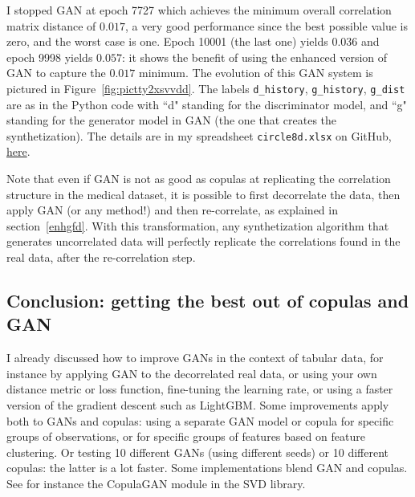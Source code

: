 \documentclass[oneside,10pt]{book}
\begin{document}
I stopped GAN at epoch 7727 which achieves the minimum overall
\textcolor{index}{correlation matrix distance} of $0.017$, a very good performance since the best possible value is zero, and the worst case is one. Epoch 10001 (the last one) yields
$0.036$ and epoch 9998 yields $0.057$: it shows the benefit of using the enhanced version of GAN to capture the $0.017$ minimum.
The evolution of this GAN system is pictured in Figure~\ref{fig:pictty2xsvvdd}. The labels \texttt{d\_history},
\texttt{g\_history}, \texttt{g\_dist} are as in the Python code with ``d" standing for the discriminator model, and ``g" standing for the generator model in GAN (the one that creates the synthetization).
The details are in my spreadsheet \texttt{circle8d.xlsx} on GitHub, \href{https://github.com/VincentGranville/Main/blob/main/circle8D.xlsx}{here}.

Note that even if GAN is not as good as copulas at replicating the correlation structure in the medical dataset, it is possible to first
\textcolor{index}{decorrelate} the data, then apply GAN (or any method!) and then re-correlate, as explained in section~\ref{enhgfd}. With this transformation, any synthetization algorithm that
 generates uncorrelated data will perfectly replicate the correlations found in the real data, after the re-correlation step.


\subsection{Conclusion: getting the best out of copulas and GAN}\label{gantrasd}

I already discussed how to improve GANs in the context of tabular data, for instance by applying GAN to the
\textcolor{index}{decorrelated} real data, or using your own distance metric or
\textcolor{index}{loss function}, fine-tuning the \textcolor{index}{learning rate}, or using a faster version of the gradient descent such as \textcolor{index}{LightGBM}. Some improvements apply both to GANs and copulas: using a separate GAN model or copula for specific groups of observations, or for specific groups of features based on
\textcolor{index}{feature clustering}. Or testing 10 different GANs (using different seeds) or 10 different copulas: the latter is a lot faster.
Some implementations blend GAN and copulas. See for instance the CopulaGAN module in the \textcolor{index}{SVD} library.
\end{document}

